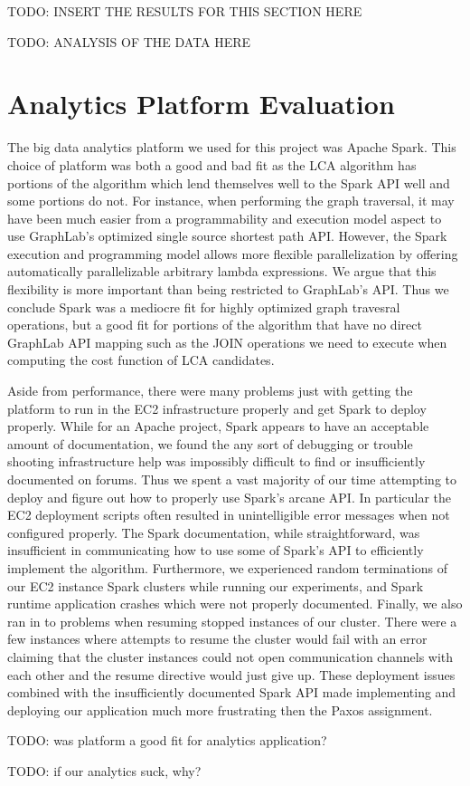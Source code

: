 \documentclass{article}
\begin{document}


TODO: INSERT THE RESULTS FOR THIS SECTION HERE

TODO: ANALYSIS OF THE DATA HERE

\section{Analytics Platform Evaluation}

The big data analytics platform we used for this project was Apache Spark.
This choice of platform was both a good and bad fit as the LCA algorithm has portions of the algorithm which lend themselves well to the Spark API well and some portions do not.
For instance, when performing the graph traversal, it may have been much easier from a programmability and execution model aspect to use GraphLab's optimized single source shortest path API.
However, the Spark execution and programming model allows more flexible parallelization by offering automatically parallelizable arbitrary lambda expressions.
We argue that this flexibility is more important than being restricted to GraphLab's API.
Thus we conclude Spark was a mediocre fit for highly optimized graph travesral operations, but a good fit for portions of the algorithm that have no direct GraphLab API mapping such as the JOIN operations we need to execute when computing the cost function of LCA candidates.

Aside from performance, there were many problems just with getting the platform to run in the EC2 infrastructure properly and get Spark to deploy properly.
While for an Apache project, Spark appears to have an acceptable amount of documentation, we found the any sort of debugging or trouble shooting infrastructure help was impossibly difficult to find or insufficiently documented on forums.
Thus we spent a vast majority of our time attempting to deploy and figure out how to properly use Spark's arcane API.
In particular the EC2 deployment scripts often resulted in unintelligible error messages when not configured properly.
The Spark documentation, while straightforward, was insufficient in communicating how to use some of Spark's API to efficiently implement the algorithm.
Furthermore, we experienced random terminations of our EC2 instance Spark clusters while running our experiments, and Spark runtime application crashes which were not properly documented.
Finally, we also ran in to problems when resuming stopped instances of our cluster.
There were a few instances where attempts to resume the cluster would fail with an error claiming that the cluster instances could not open communication channels with each other and the resume directive would just give up.
These deployment issues combined with the insufficiently documented Spark API made implementing and deploying our application much more frustrating then the Paxos assignment.

TODO: was platform a good fit for analytics application?

TODO: if our analytics suck, why?
\end{document}
